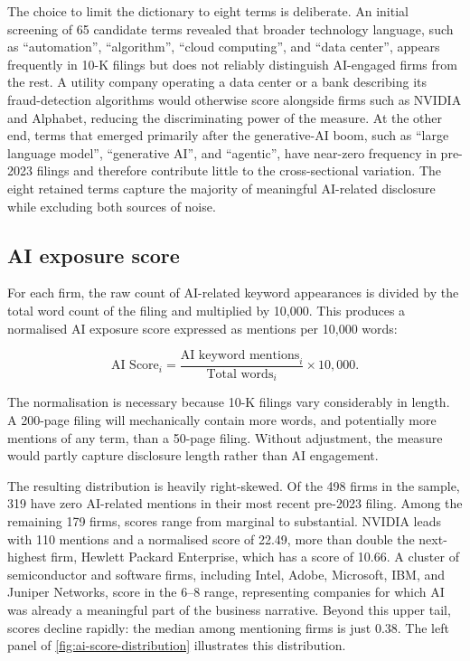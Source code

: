 The choice to limit the dictionary to eight terms is deliberate. An initial screening of 65 candidate terms revealed that broader technology language, such as ``automation'', ``algorithm'', ``cloud computing'', and ``data center'', appears frequently in 10-K filings but does not reliably distinguish AI-engaged firms from the rest. A utility company operating a data center or a bank describing its fraud-detection algorithms would otherwise score alongside firms such as NVIDIA and Alphabet, reducing the discriminating power of the measure. At the other end, terms that emerged primarily after the generative-AI boom, such as ``large language model'', ``generative AI'', and ``agentic'', have near-zero frequency in pre-2023 filings and therefore contribute little to the cross-sectional variation. The eight retained terms capture the majority of meaningful AI-related disclosure while excluding both sources of noise.

\subsection{AI exposure score}
\label{subsec:ai-exposure-score}

For each firm, the raw count of AI-related keyword appearances is divided by the total word count of the filing and multiplied by 10,000. This produces a normalised AI exposure score expressed as mentions per 10,000 words:

\begin{equation}
    \text{AI Score}_i
    =
    \frac{\text{AI keyword mentions}_i}{\text{Total words}_i}
    \times 10{,}000.
    \label{eq:ai-score}
\end{equation}

\noindent The normalisation is necessary because 10-K filings vary considerably in length. A 200-page filing will mechanically contain more words, and potentially more mentions of any term, than a 50-page filing. Without adjustment, the measure would partly capture disclosure length rather than AI engagement.

The resulting distribution is heavily right-skewed. Of the 498 firms in the sample, 319 have zero AI-related mentions in their most recent pre-2023 filing. Among the remaining 179 firms, scores range from marginal to substantial. NVIDIA leads with 110 mentions and a normalised score of 22.49, more than double the next-highest firm, Hewlett Packard Enterprise, which has a score of 10.66. A cluster of semiconductor and software firms, including Intel, Adobe, Microsoft, IBM, and Juniper Networks, score in the 6--8 range, representing companies for which AI was already a meaningful part of the business narrative. Beyond this upper tail, scores decline rapidly: the median among mentioning firms is just 0.38. The left panel of \cref{fig:ai-score-distribution} illustrates this distribution.

